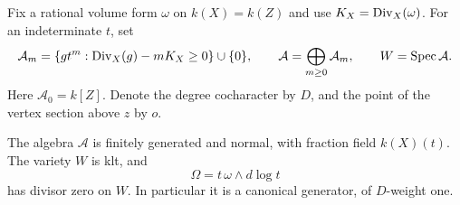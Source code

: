Fix a rational volume form \(\omega\) on \(k(X)=k(Z)\) and use
\(K_X=\operatorname{Div}_X(\omega)\). For an indeterminate \(t\), set
\[
 \mathcal A_m=
 \{g t^m:\operatorname{Div}_X(g)-mK_X\geq0\}\cup\{0\},\qquad
 \mathcal A=\bigoplus_{m\geq0}\mathcal A_m,\qquad
 W=\operatorname{Spec}\mathcal A .
\]
Here \(\mathcal A_0=k[Z]\). Denote the degree cocharacter by \(D\), and
the point of the vertex section above \(z\) by \(o\).

\begin{lemma}\label{a:canonical-cone}
The algebra \(\mathcal A\) is finitely generated and normal, with fraction
field \(k(X)(t)\). The variety \(W\) is klt, and
\[
                   \Omega=t\,\omega\wedge d\log t
\]
has divisor zero on \(W\). In particular it is a canonical generator,
of \(D\)-weight one.
\end{lemma}

